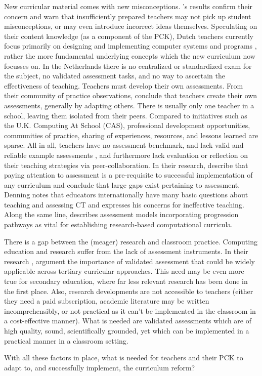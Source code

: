 New curricular material comes with new misconceptions. \citeauthor{duncan2017teachers}'s results confirm their concern and warn that insufficiently prepared teachers may not pick up student misconceptions, or may even introduce incorrect ideas themselves. Speculating on their content knowledge (as a component of the PCK), Dutch teachers currently focus primarily on designing and implementing computer systems and programs \cite{Schmidt2007}, rather the more fundamental underlying concepts which the new curriculum now focusses on. In the Netherlands there is no centralized or standardized exam for the subject, no validated assessment tasks, and no way to ascertain the effectiveness of teaching. Teachers must develop their own assessments. From their community of practice observations,  conclude that teachers create their own assessments, generally by adapting others. There is usually only one teacher in a school, leaving them isolated from their peers. Compared to initiatives such as the U.K. Computing At School (CAS), professional development opportunities, communities of practice, sharing of experiences, resources, and lessons learned are sparse. All in all, teachers have no assessment benchmark, and lack valid and reliable example assessments \cite{Yadav2015}, and furthermore lack evaluation or reflection on their teaching strategies via peer-collaboration. In their research,  describe that paying attention to assessment is a pre-requisite to successful implementation of any curriculum and conclude that large gaps exist pertaining to assessment. Denning \cite{denning2017remaining} notes that educators internationally have many basic questions about teaching and assessing CT and expresses his concerns for ineffective teaching. Along the same line,  describes assessment models incorporating progression pathways as vital for establishing research-based computational curricula.


There is a gap between the (meager) research and classroom practice\cite{Yadav2015}. Computing education and research suffer from the lack of assessment instruments\cite{voogt2017effecten}. In their research , argument the importance of validated assessment that could be widely applicable across tertiary curricular approaches. This need may be even more true for secondary education, where far less relevant research has been done in the first place. Also, research developments are not accessible to teachers (either they need a paid subscription, academic literature may be written incomprehensibly, or not practical as it can't be implemented in the classroom in a cost-effective manner). What is needed are validated assessments which are of high quality, sound, scientifically grounded, yet which can be implemented in a practical manner in a classroom setting.

With all these factors in place, what is needed for teachers and their PCK to adapt to, and successfully implement, the curriculum reform?
